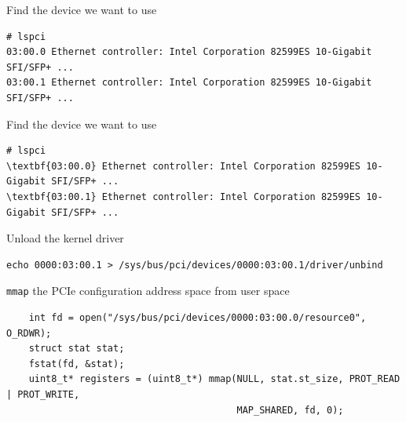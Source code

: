 \documentclass[NET,english,aspectratio=169]{tumbeamer}
\begin{document}

\begin{frame}[fragile=singleslide]{Find the device we want to use}
\begin{Verbatim}[commandchars=\\\{\}]
# lspci
03:00.0 Ethernet controller: Intel Corporation 82599ES 10-Gigabit SFI/SFP+ ...
03:00.1 Ethernet controller: Intel Corporation 82599ES 10-Gigabit SFI/SFP+ ...
\end{Verbatim}
\end{frame}

\begin{frame}[fragile=singleslide]{Find the device we want to use}
\begin{Verbatim}[commandchars=\\\{\}]
# lspci
\textbf{03:00.0} Ethernet controller: Intel Corporation 82599ES 10-Gigabit SFI/SFP+ ...
\textbf{03:00.1} Ethernet controller: Intel Corporation 82599ES 10-Gigabit SFI/SFP+ ...
\end{Verbatim}
\end{frame}

\begin{frame}[fragile=singleslide]{Unload the kernel driver}
\begin{verbatim}
echo 0000:03:00.1 > /sys/bus/pci/devices/0000:03:00.1/driver/unbind
\end{verbatim}
\end{frame}

\begin{frame}[fragile=singleslide]{\texttt{mmap} the PCIe configuration address space from user space}
\begin{verbatim}
	int fd = open("/sys/bus/pci/devices/0000:03:00.0/resource0", O_RDWR);
	struct stat stat;
	fstat(fd, &stat);
	uint8_t* registers = (uint8_t*) mmap(NULL, stat.st_size, PROT_READ | PROT_WRITE,
	                                     MAP_SHARED, fd, 0);
\end{verbatim}
\end{frame}
\end{document}
